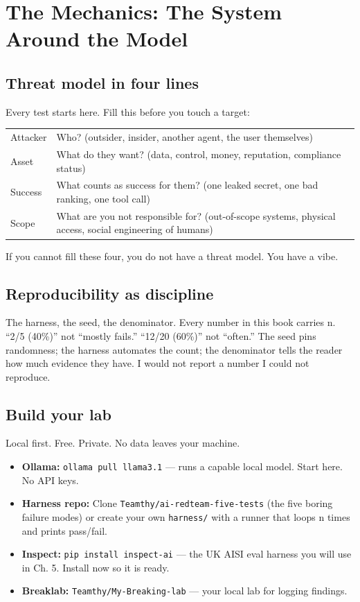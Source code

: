 \section{The Mechanics: The System Around the Model}
\tierP

\subsection{Threat model in four lines}
Every test starts here. Fill this before you touch a target:

\begin{center}
\begin{tabularx}{\linewidth}{lX}
\toprule
Attacker & Who? (outsider, insider, another agent, the user themselves) \\
Asset & What do they want? (data, control, money, reputation, compliance status) \\
Success & What counts as success for them? (one leaked secret, one bad ranking, one tool call) \\
Scope & What are you not responsible for? (out-of-scope systems, physical access, social engineering of humans) \\
\bottomrule
\end{tabularx}
\end{center}
If you cannot fill these four, you do not have a threat model. You have a vibe.

\subsection{Reproducibility as discipline}
The harness, the seed, the denominator. Every number in this book carries n. ``2/5 (40\%)'' not ``mostly fails.'' ``12/20 (60\%)'' not ``often.'' The seed pins randomness; the harness automates the count; the denominator tells the reader how much evidence they have. I would not report a number I could not reproduce.

\subsection{Build your lab}
Local first. Free. Private. No data leaves your machine.

\begin{itemize}
\item \textbf{Ollama:} \texttt{ollama pull llama3.1} — runs a capable local model. Start here. No API keys.
\item \textbf{Harness repo:} Clone \texttt{Teamthy/ai-redteam-five-tests} (the five boring failure modes) or create your own \texttt{harness/} with a runner that loops n times and prints pass/fail.
\item \textbf{Inspect:} \texttt{pip install inspect-ai} — the UK AISI eval harness you will use in Ch. 5. Install now so it is ready.
\item \textbf{Breaklab:} \texttt{Teamthy/My-Breaking-lab} — your local lab for logging findings.
\end{itemize}

